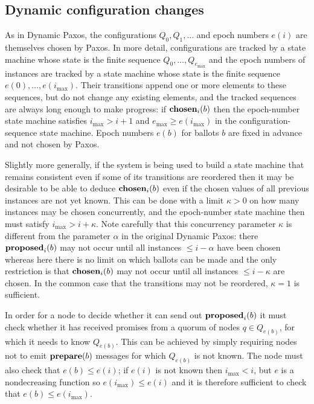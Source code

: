 \documentclass[journal]{IEEEtran}
\begin{document}
\subsection{Dynamic configuration changes}

As in Dynamic Paxos, the configurations $Q_0, Q_1, \ldots$ and epoch numbers
$e(i)$ are themselves chosen by Paxos. In more detail, configurations are
tracked by a state machine whose state is the finite sequence $Q_0, \ldots,
Q_{e_\mathrm{max}}$ and the epoch numbers of instances are tracked by a state
machine whose state is the finite sequence $e(0), \ldots, e(i_\mathrm{max})$.
Their transitions append one or more elements to these sequences, but do not
change any existing elements, and the tracked sequences are always long enough
to make progress: if $\mathbf{chosen}_{i}(b)$ then the epoch-number state machine
satisfies $i_\mathrm{max} > i+1$ and $e_\mathrm{max} \ge e(i_\mathrm{max})$ in
the configuration-sequence state machine. Epoch numbers $e(b)$ for ballots
$b$ are fixed in advance and not chosen by Paxos.

Slightly more generally, if the system is being used to build a state machine
that remains consistent even if some of its transitions are reordered then it
may be desirable to be able to deduce $\mathbf{chosen}_{i}(b)$ even if the chosen values
of all previous instances are not yet known.  This can be done with a limit
$\kappa > 0$ on how many instances may be chosen concurrently, and the
epoch-number state machine then must satisfy $i_\mathrm{max} > i + \kappa$.
Note carefully that this concurrency parameter $\kappa$ is different from the
parameter $\alpha$ in the original Dynamic Paxos: there $\mathbf{proposed}_{i}(b)$ may not
occur until all instances $\le i - \alpha$ have been chosen whereas here there
is no limit on which ballots can be made and the only restriction is that
$\mathbf{chosen}_{i}(b)$ may not occur until all instances $\le i - \kappa$ are chosen.
In the common case that the transitions may not be reordered, $\kappa = 1$ is
sufficient.

In order for a node to decide whether it can send out $\mathbf{proposed}_{i}(b)$ it must
check whether it has received promises from a quorum of nodes $q \in Q_{e(b)}$,
for which it needs to know $Q_{e(b)}$. This can be achieved by simply requiring
nodes not to emit $\mathbf{prepare}(b)$ messages for which $Q_{e(b)}$ is not known. The
node must also check that $e(b) \le e(i)$; if $e(i)$ is not known then
$i_\mathrm{max} < i$, but $e$ is a nondecreasing function so $e(i_\mathrm{max})
\le e(i)$ and it is therefore sufficient to check that $e(b) \le
e(i_\mathrm{max})$.
\end{document}
